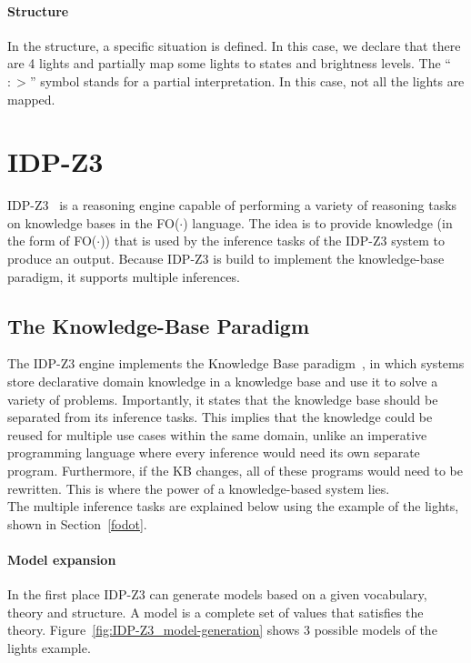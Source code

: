 \documentclass[11pt,a4paper]{report}
\newcommand{\fodot}{FO($\cdot$)\xspace}
\begin{document}
\paragraph{Structure}
In the structure, a specific situation is defined. In this case, we declare that there are 4 lights and partially map some lights to states and brightness levels. The ``$:>$'' symbol stands for a partial interpretation. In this case, not all the lights are mapped. 



\section{IDP-Z3}
IDP-Z3~\cite{IDPZ3ReasoningEngine} is a reasoning engine capable of performing a variety of reasoning tasks on knowledge bases in the \fodot language. The idea is to provide knowledge (in the form of \fodot) that is used by the inference tasks of the IDP-Z3 system to produce an output. Because IDP-Z3 is build to implement the knowledge-base paradigm, it supports multiple inferences.

\subsection{The Knowledge-Base Paradigm}
The IDP-Z3 engine implements the Knowledge Base paradigm~\cite{IDPZ3KBParadigm}, in which systems store declarative domain knowledge in a knowledge base and use it to solve a variety of problems. Importantly, it states that the knowledge base should be separated from its inference tasks. This implies that the knowledge could be reused for multiple use cases within the same domain, unlike an imperative programming language where every inference would need its own separate program. Furthermore, if the KB changes, all of these programs would need to be rewritten. This is where the power of a knowledge-based system lies.\\
The multiple inference tasks are explained below using the example of the lights, shown in Section~\ref{fodot}.

\paragraph{Model expansion}
In the first place IDP-Z3 can generate models based on a given vocabulary, theory and structure. A model is a complete set of values that satisfies the theory. Figure~\ref{fig:IDP-Z3_model-generation} shows 3 possible models of the lights example. 
\end{document}
